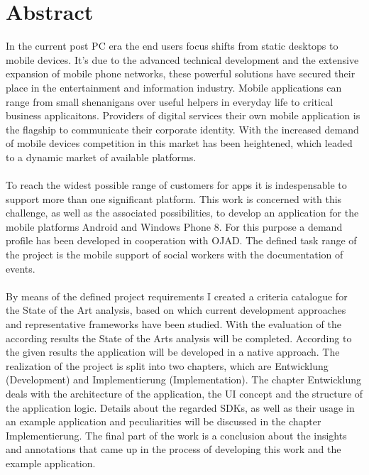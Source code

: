 \documentclass[Bachelorarbeit.tex]{subfiles}
\begin{document}
\chapter*{Abstract}

In the current post PC era the end users focus shifts from static desktops to mobile devices.
It’s due to the advanced technical development and the extensive expansion of mobile phone networks, these powerful solutions have secured their place in the entertainment and information industry.
Mobile applications can range from small shenanigans over useful helpers in everyday life to critical business applicaitons.
Providers of digital services their own mobile application is the flagship to communicate their corporate identity.
With the increased demand of mobile devices competition in this market has been heightened, which leaded to a dynamic market of available platforms.\\
\\
To reach the widest possible range of customers for apps it is indespensable to support more than one significant platform.
This work is concerned with this challenge, as well as the associated possibilities, to develop an application for the mobile platforms Android and Windows Phone 8.
For this purpose a demand profile has been developed in cooperation with OJAD. The defined task range of the project is the mobile support of social workers with the documentation of events.\\
\\
By means of the defined project requirements I created a criteria catalogue for the State of the Art analysis, based on which current development approaches and representative frameworks have been studied.
With the evaluation of the according results the State of the Arts analysis will be completed. According to the given results the application will be developed in a native approach.
The realization of the project is split into two chapters, which are Entwicklung (Development) and Implementierung (Implementation). 
The chapter Entwicklung deals with the architecture of the application, the UI concept and the structure of the application logic. Details about the regarded SDKs, as well as their usage in an example application and peculiarities will be discussed in the chapter Implementierung.
The final part of the work is a conclusion about the insights and annotations that came up in the process of developing this work and the example application.
\end{document}
